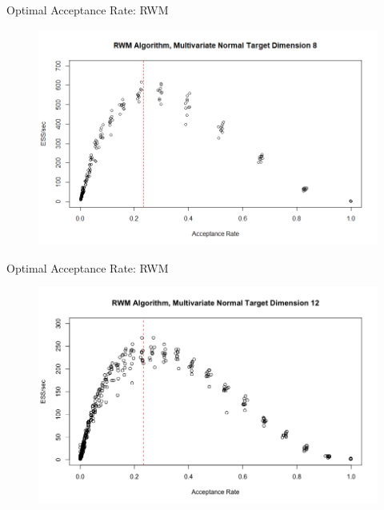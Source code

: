 \documentclass{beamer}
\begin{document}

\begin{frame}{Optimal Acceptance Rate: RWM}
\begin{figure}
\centering
\includegraphics[scale = 0.4]{RWM_Optimal8.png}
\end{figure}
\end{frame}


\begin{frame}{Optimal Acceptance Rate: RWM}
\begin{figure}
\centering
\includegraphics[scale = 0.3]{RWM_Optimal12.png}
\end{figure}
\end{frame}

\end{document}
